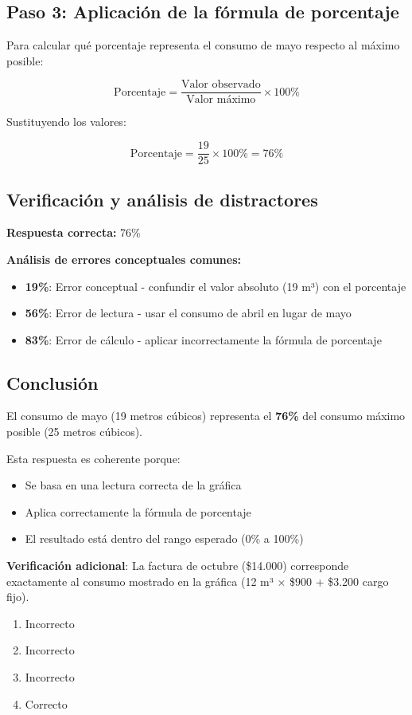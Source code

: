 \documentclass[a4paper]{article}
\newenvironment{solution}{}{}
\newenvironment{answerlist}{\begin{enumerate}}{\end{enumerate}}
\begin{document}
\begin{solution}
\subsection*{Paso 3: Aplicación de la fórmula de porcentaje}

Para calcular qué porcentaje representa el consumo de mayo respecto al máximo posible:

$$\text{Porcentaje} = \frac{\text{Valor observado}}{\text{Valor máximo}} \times 100\%$$

Sustituyendo los valores:

$$\text{Porcentaje} = \frac{19}{25} \times 100\% = 76\%$$

\subsection*{Verificación y análisis de distractores}

\textbf{Respuesta correcta:} 76\%

\textbf{Análisis de errores conceptuales comunes:}\begin{itemize}\item \textbf{19\%}: Error conceptual - confundir el valor absoluto (19 m³) con el porcentaje
\item \textbf{56\%}: Error de lectura - usar el consumo de abril en lugar de mayo
\item \textbf{83\%}: Error de cálculo - aplicar incorrectamente la fórmula de porcentaje\end{itemize}
\subsection*{Conclusión}

El consumo de mayo (19 metros cúbicos) representa el \textbf{76\%} del consumo máximo posible (25 metros cúbicos).

Esta respuesta es coherente porque:

\begin{itemize}
\item Se basa en una lectura correcta de la gráfica
\item Aplica correctamente la fórmula de porcentaje
\item El resultado está dentro del rango esperado (0\% a 100\%)
\end{itemize}

\textbf{Verificación adicional}: La factura de octubre (\$14.000) corresponde exactamente al consumo mostrado en la gráfica (12 m³ $\times$ \$900 + \$3.200 cargo fijo).

\begin{answerlist}
  \item Incorrecto
  \item Incorrecto
  \item Incorrecto
  \item Correcto
\end{answerlist}\end{solution}
\end{document}
